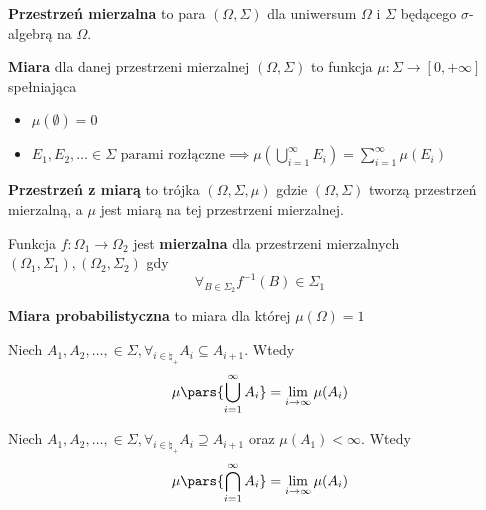\begin{definition}
	\textbf{Przestrzeń mierzalna} to para \((\Omega, \Sigma)\) dla uniwersum \(\Omega\) i \(\Sigma\) będącego \(\sigma\)-algebrą na \(\Omega\).
\end{definition}

\begin{definition}
	\textbf{Miara} dla danej przestrzeni mierzalnej \((\Omega, \Sigma)\) to funkcja \(\mu: \Sigma \to [0, +\infty]\) spełniająca
	\begin{itemize}
		\item \(\mu(\emptyset) = 0\)
		\item \(E_1, E_2, \dots \in \Sigma \text{ parami rozłączne} \implies \mu(\bigcup_{i=1}^\infty E_i) = \sum_{i=1}^{\infty} \mu(E_i)\)
	\end{itemize}
\end{definition}

\begin{definition}
	\textbf{Przestrzeń z miarą} to trójka \((\Omega, \Sigma, \mu)\) gdzie \((\Omega, \Sigma)\) tworzą przestrzeń mierzalną, a \(\mu\) jest miarą na tej przestrzeni mierzalnej.
\end{definition}

\begin{definition}
	Funkcja \(f: \Omega_1 \to \Omega_2\) jest \textbf{mierzalna} dla przestrzeni mierzalnych \((\Omega_1, \Sigma_1), (\Omega_2, \Sigma_2)\) gdy
	\[
		\forall_{B \in \Sigma_2} f^{-1}(B) \in \Sigma_1
	\]
\end{definition}

\begin{definition}
	\textbf{Miara probabilistyczna} to miara dla której \(\mu(\Omega) = 1\)
\end{definition}

\begin{lemma}
	Niech \(A_1, A_2, \dots, \in \Sigma, \forall_{i \in \natural_+} A_i \subseteq A_{i+1}\). Wtedy
	\[
		\mu\pars{\bigcup_{i=1}^\infty A_i} = \lim_{i \to \infty} \mu(A_i)
	\]
\end{lemma}

\begin{lemma}
	Niech \(A_1, A_2, \dots, \in \Sigma, \forall_{i \in \natural_+} A_i \supseteq A_{i+1}\) oraz \(\mu(A_1) < \infty\). Wtedy
	\[
		\mu\pars{\bigcap_{i=1}^\infty A_i} = \lim_{i \to \infty} \mu(A_i)
	\]
\end{lemma}

